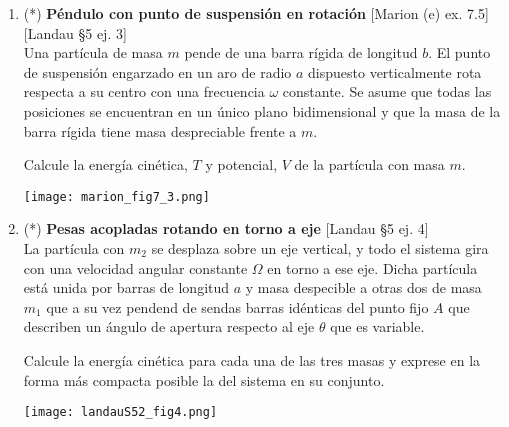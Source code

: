 \documentclass[11pt, spanish, a4paper, twoside]{article}
\begin{document}
\begin{enumerate}
\item
	\begin{minipage}[t][7.1cm]{0.5\textwidth}
		(*) \textbf{Péndulo con punto de suspensión en rotación} [Marion (e) ex. 7.5] [Landau \S5 ej. 3]\\

		Una partícula de masa \(m\) pende de una barra rígida de longitud \(b\).
		El punto de suspensión engarzado en un aro de radio \(a\) dispuesto verticalmente rota respecta a su centro con una frecuencia \(\omega\) constante.
		Se asume que todas las posiciones se encuentran en un único plano bidimensional y que la masa de la barra rígida tiene masa despreciable frente a \(m\).

		Calcule la energía cinética, \(T\) y potencial, \(V\) de la partícula con masa \(m\).\end{minipage}
	\begin{minipage}[c][3cm][t]{0.5\textwidth}
		\texttt{[image: marion\_fig7\_3.png]}
	\end{minipage}



\item
	\begin{minipage}[t][4.5cm]{0.65\textwidth}
		(*) \textbf{Pesas acopladas rotando en torno a eje} [Landau \S5 ej. 4]\\

		La partícula con \(m_2\) se desplaza sobre un eje vertical, y todo el sistema gira con una velocidad angular constante \(\Omega\) en torno a ese eje.
		Dicha partícula está unida por barras de longitud \(a\) y masa despecible a otras dos de masa \(m_1\) que a su vez pendend de sendas barras idénticas del punto fijo \(A\) que describen un ángulo de apertura respecto al eje \(\theta\) que es variable.

			Calcule la energía cinética para cada una de las tres masas y exprese en la forma más compacta posible la del sistema en su conjunto.
	\end{minipage}
	\begin{minipage}[c][1cm][t]{0.35\textwidth}
		\texttt{[image: landauS52\_fig4.png]}
	\end{minipage}



\end{enumerate}
\end{document}
